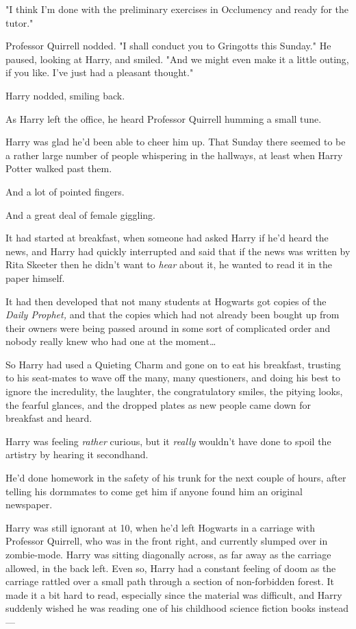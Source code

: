 "I think I'm done with the preliminary exercises in Occlumency and ready for
the tutor."

Professor Quirrell nodded. "I shall conduct you to Gringotts this Sunday." He
paused, looking at Harry, and smiled. "And we might even make it a little
outing, if you like. I've just had a pleasant thought."

Harry nodded, smiling back.

As Harry left the office, he heard Professor Quirrell humming a small tune.

Harry was glad he'd been able to cheer him up.
\sbreak
That Sunday there seemed to be a rather large number of people whispering in
the hallways, at least when Harry Potter walked past them.

And a lot of pointed fingers.

And a great deal of female giggling.

It had started at breakfast, when someone had asked Harry if he'd heard the
news, and Harry had quickly interrupted and said that if the news was written
by Rita Skeeter then he didn't want to \emph{hear} about it, he wanted to read
it in the paper himself.

It had then developed that not many students at Hogwarts got copies of the
\emph{Daily Prophet,} and that the copies which had not already been bought up
from their owners were being passed around in some sort of complicated order
and nobody really knew who had one at the moment{\ldots}

So Harry had used a Quieting Charm and gone on to eat his breakfast, trusting
to his seat-mates to wave off the many, many questioners, and doing his best to
ignore the incredulity, the laughter, the congratulatory smiles, the pitying
looks, the fearful glances, and the dropped plates as new people came down for
breakfast and heard.

Harry was feeling \emph{rather} curious, but it \emph{really} wouldn't have
done to spoil the artistry by hearing it secondhand.

He'd done homework in the safety of his trunk for the next couple of hours,
after telling his dormmates to come get him if anyone found him an original
newspaper.

Harry was still ignorant at 10\AM, when he'd left Hogwarts in a carriage with
Professor Quirrell, who was in the front right, and currently slumped over in
zombie-mode. Harry was sitting diagonally across, as far away as the carriage
allowed, in the back left. Even so, Harry had a constant feeling of doom as the
carriage rattled over a small path through a section of non-forbidden forest.
It made it a bit hard to read, especially since the material was difficult, and
Harry suddenly wished he was reading one of his childhood science fiction books
instead---

